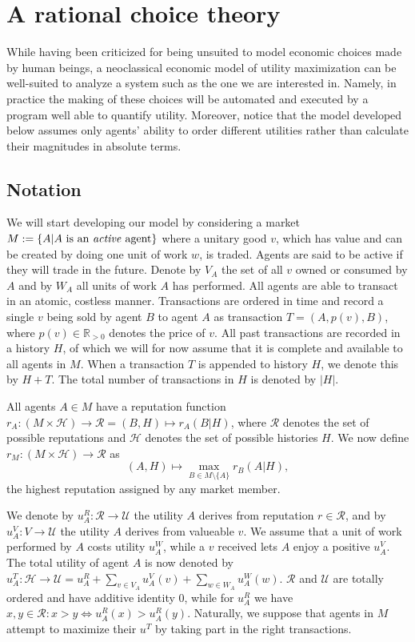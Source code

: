 \chapter{A rational choice theory}
While having been criticized for being unsuited to model economic choices made by human beings, 
a neoclassical economic model of utility maximization can be well-suited to analyze a system such as the one we are interested in. 
Namely, in practice the making of these choices will be automated and executed by a program well able to quantify utility. 
Moreover, notice that the model developed below assumes only agents' ability to order different utilities rather than calculate their magnitudes in absolute terms.

\section{Notation}\label{section:model_notation}
We will start developing our model by considering a market $M := \{ A | A \ \text{is an \emph{active} agent} \}$ where a unitary good $v$, 
which has value and can be created by doing one unit of work $w$, is traded. 
Agents are said to be active if they will trade in the future. 
Denote by $V_A$ the set of all $v$ owned or consumed by $A$ and by $W_A$ all units of work $A$ has performed. 
All agents are able to transact in an atomic, costless manner. 
Transactions are ordered in time and record a single $v$ being sold by agent $B$ to agent $A$ as transaction $T = (A, p(v), B)$, 
where $p(v) \in \mathds{R}_{>0}$ denotes the price of $v$. 
All past transactions are recorded in a history $H$, 
of which we will for now assume that it is complete and available to all agents in $M$. 
When a transaction $T$ is appended to history $H$, 
we denote this by $H + T$. 
The total number of transactions in $H$ is denoted by $|H|$.

All agents $A \in M$ have a reputation function $r_A: (M \times \mathcal{H}) \to \mathcal{R} = (B, H) \mapsto r_A(B | H)$, 
where $\mathcal{R}$ denotes the set of possible reputations and $\mathcal{H}$ denotes the set of possible histories $H$. 
We now define $r_M: (M \times \mathcal{H}) \to \mathcal{R}$ as
\[(A, H) \mapsto \max_{B \in M \setminus \{ A \}} r_B(A | H),\]
the highest reputation assigned by any market member.

We denote by $u^R_A: \mathcal{R} \to \mathcal{U}$ the utility $A$ derives from reputation $r \in \mathcal{R}$, 
and by $u^V_A: V \to \mathcal{U}$ the utility $A$ derives from valueable $v$. 
We assume that a unit of work performed by $A$ costs utility $u^W_A$, 
while a $v$ received lets $A$ enjoy a positive $u^V_A$. 
The total utility of agent $A$ is now denoted by $u^T_A: \mathcal{H} \to \mathcal{U} = u^R_A + \sum_{v \in V_A} u^V_A(v) + \sum_{w \in W_A} u^W_A(w)$. 
$\mathcal{R}$ and $\mathcal{U}$ are totally ordered and have additive identity $0$, 
while for $u^R_A$ we have $x, y \in \mathcal{R}: x > y \Leftrightarrow u^R_A(x) > u^R_A(y)$. 
Naturally, we suppose that agents in $M$ attempt to maximize their $u^T$ by taking part in the right transactions.

